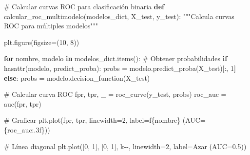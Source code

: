 \documentclass[
  doc,
  floatsintext,
  longtable,
  a4paper,
  nolmodern,
  notxfonts,
  notimes,
  12pt,
  colorlinks=true,linkcolor=blue,citecolor=blue,urlcolor=blue]{apa7}
\newenvironment{Shaded}{\begin{snugshade}}{\end{snugshade}}
\newcommand{\BuiltInTok}[1]{\textcolor[rgb]{0.00,0.23,0.31}{#1}}
\newcommand{\CommentTok}[1]{\textcolor[rgb]{0.37,0.37,0.37}{#1}}
\newcommand{\ControlFlowTok}[1]{\textcolor[rgb]{0.00,0.23,0.31}{\textbf{#1}}}
\newcommand{\DecValTok}[1]{\textcolor[rgb]{0.68,0.00,0.00}{#1}}
\newcommand{\KeywordTok}[1]{\textcolor[rgb]{0.00,0.23,0.31}{\textbf{#1}}}
\newcommand{\NormalTok}[1]{\textcolor[rgb]{0.00,0.23,0.31}{#1}}
\newcommand{\OperatorTok}[1]{\textcolor[rgb]{0.37,0.37,0.37}{#1}}
\newcommand{\SpecialCharTok}[1]{\textcolor[rgb]{0.37,0.37,0.37}{#1}}
\newcommand{\SpecialStringTok}[1]{\textcolor[rgb]{0.13,0.47,0.30}{#1}}
\newcommand{\StringTok}[1]{\textcolor[rgb]{0.13,0.47,0.30}{#1}}
\begin{document}
\begin{Shaded}
\begin{Highlighting}[]
\CommentTok{\# Calcular curvas ROC para clasificación binaria}
\KeywordTok{def}\NormalTok{ calcular\_roc\_multimodelo(modelos\_dict, X\_test, y\_test):}
    \CommentTok{"""Calcula curvas ROC para múltiples modelos"""}
    
\NormalTok{    plt.figure(figsize}\OperatorTok{=}\NormalTok{(}\DecValTok{10}\NormalTok{, }\DecValTok{8}\NormalTok{))}
    
    \ControlFlowTok{for}\NormalTok{ nombre, modelo }\KeywordTok{in}\NormalTok{ modelos\_dict.items():}
        \CommentTok{\# Obtener probabilidades}
        \ControlFlowTok{if} \BuiltInTok{hasattr}\NormalTok{(modelo, }\StringTok{\textquotesingle{}predict\_proba\textquotesingle{}}\NormalTok{):}
\NormalTok{            probs }\OperatorTok{=}\NormalTok{ modelo.predict\_proba(X\_test)[:, }\DecValTok{1}\NormalTok{]}
        \ControlFlowTok{else}\NormalTok{:}
\NormalTok{            probs }\OperatorTok{=}\NormalTok{ modelo.decision\_function(X\_test)}
        
        \CommentTok{\# Calcular curva ROC}
\NormalTok{        fpr, tpr, \_ }\OperatorTok{=}\NormalTok{ roc\_curve(y\_test, probs)}
\NormalTok{        roc\_auc }\OperatorTok{=}\NormalTok{ auc(fpr, tpr)}
        
        \CommentTok{\# Graficar}
\NormalTok{        plt.plot(fpr, tpr, linewidth}\OperatorTok{=}\DecValTok{2}\NormalTok{, }
\NormalTok{                label}\OperatorTok{=}\SpecialStringTok{f\textquotesingle{}}\SpecialCharTok{\{}\NormalTok{nombre}\SpecialCharTok{\}}\SpecialStringTok{ (AUC=}\SpecialCharTok{\{}\NormalTok{roc\_auc}\SpecialCharTok{:.3f\}}\SpecialStringTok{)\textquotesingle{}}\NormalTok{)}
    
    \CommentTok{\# Línea diagonal}
\NormalTok{    plt.plot([}\DecValTok{0}\NormalTok{, }\DecValTok{1}\NormalTok{], [}\DecValTok{0}\NormalTok{, }\DecValTok{1}\NormalTok{], }\StringTok{\textquotesingle{}k{-}{-}\textquotesingle{}}\NormalTok{, linewidth}\OperatorTok{=}\DecValTok{2}\NormalTok{, label}\OperatorTok{=}\StringTok{\textquotesingle{}Azar (AUC=0.5)\textquotesingle{}}\NormalTok{)}
    

\end{Highlighting}
\end{Shaded}
\end{document}
